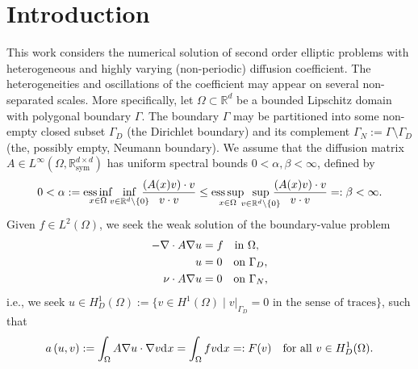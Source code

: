 \documentclass[10pt]{article}
\numberwithin{equation}{section}
\theoremstyle{plain}
\theoremstyle{definition}
\theoremstyle{remark}
\begin{document}
 \section{Introduction}
This work considers the numerical solution of second order elliptic problems with heterogeneous and highly varying (non-periodic) diffusion coefficient. The heterogeneities and oscillations of the coefficient may appear on several non-separated scales. 
More specifically, let $\Omega\subset\mathbb{R}^{d}$ be a bounded Lipschitz domain with polygonal boundary $\Gamma$. The boundary $\Gamma$ may be partitioned into some non-empty closed subset $\Gamma_D$ (the Dirichlet boundary) and its complement $\Gamma_N:=\Gamma\setminus\Gamma_D$ (the, possibly empty, Neumann boundary).
We assume that the diffusion matrix $A\in L^\infty\left(\Omega,\mathbb{R}_{\mathrm{sym}}^{d\times d}\right)$ has uniform spectral bounds $0<\alpha,\beta<\infty$, defined by
\begin{equation}\label{eq:ba}
0<\alpha:=\underset{x\in\Omega}{\operatorname{ess}\inf}\hspace{-1ex}
\inf\limits_{v\in\mathbb{R}^{d}\setminus\{0\}}\hspace{-2ex}\dfrac{(A( x)v)\cdot v}{v\cdot v}\leq\underset{x\in\Omega}{\operatorname{ess}\sup}\hspace{-1ex}
\sup\limits_{v\in\mathbb{R}^{d}\setminus\{0\}}\hspace{-2ex}\dfrac{(A( x)v)\cdot v
}{v\cdot v}=:\beta<\infty.
\end{equation}
Given $f\in L^{2}( \Omega) $, we seek the weak solution of the boundary-value problem
\begin{equation}\notag
  \begin{aligned}
    -\nabla \cdot{A} \nabla u &= f\quad \text{in }\Omega, \\
    u & = 0 \quad \text{on }\Gamma_D, \\
    \nu\cdot{A}\nabla u &= 0\quad \text{on }\Gamma_N,
  \end{aligned}
\end{equation}
i.e., we seek $u\in H^1_D(\Omega):=\{v\in H^1(\Omega)\;\vert\;v\vert_{\Gamma_D}=0\text{ in the sense of traces}\}$, such that
\begin{equation}\label{e:modelvar}
a\left(  u,v\right):=\int_{\Omega}A\nabla u\cdot \nabla
v{\operatorname*{d}\hspace{-0.3ex}x} =\int_{\Omega}fv{\operatorname*{d}\hspace{-0.3ex}x}=:F( v) \quad\text{for all } v\in H^1_D(\Omega).
\end{equation}
\end{document}
